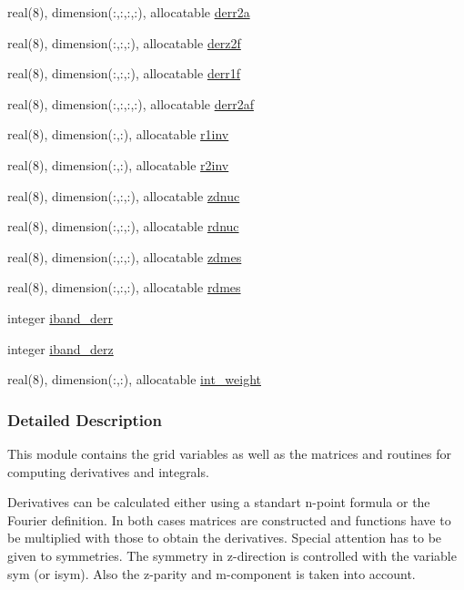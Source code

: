\begin{DoxyCompactItemize}
\item 
real(8), dimension(\+:,\+:,\+:,\+:), allocatable \hyperlink{namespacegrid_a3d6fc00aedb6c70b6a7028425fcf06b6}{derr2a}
\item 
real(8), dimension(\+:,\+:,\+:), allocatable \hyperlink{namespacegrid_a5a54381288367b46b4e714d245b33573}{derz2f}
\item 
real(8), dimension(\+:,\+:,\+:), allocatable \hyperlink{namespacegrid_a0039357c12385ef014b08446e7cc0e6c}{derr1f}
\item 
real(8), dimension(\+:,\+:,\+:,\+:), allocatable \hyperlink{namespacegrid_a8804ec2dcbfca2354a910b528fcd10d0}{derr2af}
\item 
real(8), dimension(\+:,\+:), allocatable \hyperlink{namespacegrid_a37bbb6d76b285961dc17e687364ba48d}{r1inv}
\item 
real(8), dimension(\+:,\+:), allocatable \hyperlink{namespacegrid_ac5d461ae0b4027338462085f7b2c117d}{r2inv}
\item 
real(8), dimension(\+:,\+:,\+:), allocatable \hyperlink{namespacegrid_af4a35d1cb4ef0d6a9e9eac420a4e9638}{zdnuc}
\item 
real(8), dimension(\+:,\+:,\+:), allocatable \hyperlink{namespacegrid_ab4cf4ad8b469e501cd06fbe82300f2ee}{rdnuc}
\item 
real(8), dimension(\+:,\+:,\+:), allocatable \hyperlink{namespacegrid_af1ff89ca0b7f52aa01202240df562a10}{zdmes}
\item 
real(8), dimension(\+:,\+:,\+:), allocatable \hyperlink{namespacegrid_a19320a5e6ed33bc3a07ef487bda6acff}{rdmes}
\item 
integer \hyperlink{namespacegrid_a44dd95d936820f4f1b37d0a1eb780862}{iband\+\_\+derr}
\item 
integer \hyperlink{namespacegrid_aa4819c3f9b94d2f272ae40641aedb49e}{iband\+\_\+derz}
\item 
real(8), dimension(\+:,\+:), allocatable \hyperlink{namespacegrid_a77471665506f557a1b28abdc12d6a60a}{int\+\_\+weight}
\end{DoxyCompactItemize}


\subsubsection{Detailed Description}
This module contains the grid variables as well as the matrices and routines for computing derivatives and integrals. 

Derivatives can be calculated either using a standart n-\/point formula or the Fourier definition. In both cases matrices are constructed and functions have to be multiplied with those to obtain the derivatives. Special attention has to be given to symmetries. The symmetry in z-\/direction is controlled with the variable {\ttfamily sym} (or {\ttfamily isym}). Also the z-\/parity and m-\/component is taken into account. 


